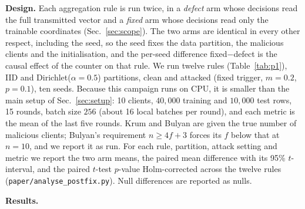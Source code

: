 \textbf{Design.} Each aggregation rule is run twice, in a \emph{defect} arm whose
decisions read the full transmitted vector and a \emph{fixed} arm whose decisions
read only the trainable coordinates (Sec.~\ref{sec:scope}). The two arms are
identical in every other respect, including the seed, so the seed fixes the data
partition, the malicious clients and the initialisation, and the per-seed
difference fixed$-$defect is the causal effect of the counter on that rule. We
run twelve rules (Table~\ref{tab:p1}), IID and Dirichlet($\alpha=0.5$)
partitions, clean and attacked (fixed trigger, $m=0.2$, $p=0.1$), ten seeds.
Because this campaign runs on CPU, it is smaller than the main setup of
Sec.~\ref{sec:setup}: 10 clients, $40{,}000$ training and $10{,}000$ test rows,
15 rounds, batch size $256$ (about 16 local batches per round), and each metric
is the mean of the last five rounds. Krum and Bulyan are given the true number of
malicious clients; Bulyan's requirement $n\ge 4f+3$ forces its $f$ below that at
$n=10$, and we report it as run. For each rule, partition, attack setting and
metric we report the two arm means, the paired mean difference with its 95\%
$t$-interval, and the paired $t$-test $p$-value Holm-corrected across the twelve
rules (\texttt{paper/analyse\_postfix.py}). Null differences are reported as
nulls.

\textbf{Results.} \PENDING

